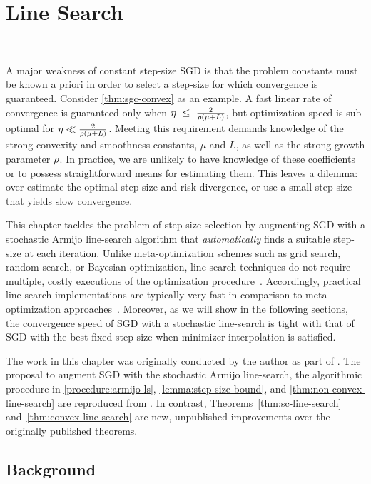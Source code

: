 
\chapter{Line Search}~\label{ch:line-search}

A major weakness of constant step-size \ac{SGD} is that the problem constants must be known a priori in order to select a step-size for which convergence is guaranteed.
Consider \autoref{thm:sgc-convex} as an example. 
A fast linear rate of convergence is guaranteed only when \( \eta~\leq~\frac{2}{\rho\left(\mu + L\right)} \), but optimization speed is sub-optimal for \( \eta \ll \frac{2}{\rho\left(\mu + L\right)} \).
Meeting this requirement demands knowledge of the strong-convexity and smoothness constants, \( \mu \) and \( L \), as well as the strong growth parameter \( \rho \).
In practice, we are unlikely to have knowledge of these coefficients or to possess straightforward means for estimating them.
This leaves a dilemma: over-estimate the optimal step-size and risk divergence, or use a small step-size that yields slow convergence. 

This chapter tackles the problem of step-size selection by augmenting \ac{SGD} with a stochastic Armijo line-search algorithm that \emph{automatically} finds a suitable step-size at each iteration.
Unlike meta-optimization schemes such as grid search, random search, or Bayesian optimization, line-search techniques do not require multiple, costly executions of the optimization procedure~\citep{snoek2012bayesian}.
Accordingly, practical line-search implementations are typically very fast in comparison to meta-optimization approaches~\citep{nocedal1999numerical}.
Moreover, as we will show in the following sections, the convergence speed of \ac{SGD} with a stochastic line-search is tight with that of \ac{SGD} with the best fixed step-size when minimizer interpolation is satisfied. 

The work in this chapter was originally conducted by the author as part of \citet{vaswani2019painless}.
The proposal to augment \ac{SGD} with the stochastic Armijo line-search, the algorithmic procedure in \autoref{procedure:armijo-ls}, \autoref{lemma:step-size-bound}, and \autoref{thm:non-convex-line-search} are reproduced from \citet{vaswani2019fast}. 
In contrast, Theorems~\ref{thm:sc-line-search} and~\ref{thm:convex-line-search} are new, unpublished improvements over the originally published theorems. 

\section{Background}~\label{sec:line-search-background}


